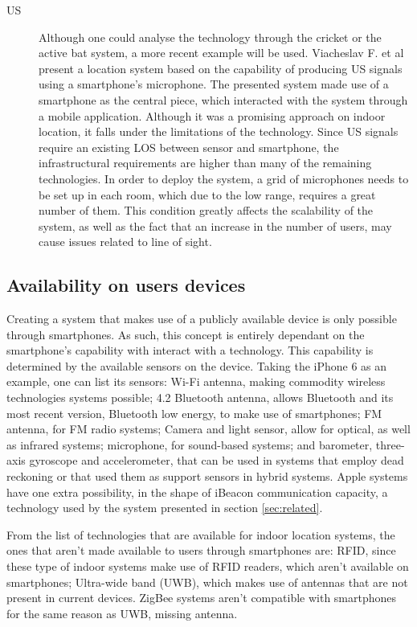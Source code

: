 \begin{description}
 
 
 
\item[\ac{US}] Although one could analyse the technology through the cricket or the active bat system, a more recent example will be used. 
Viacheslav F. et al \cite{us_ex} present a location system based on the capability of producing \ac{US} signals using a smartphone's microphone. The presented system made use of a smartphone as the central piece, which interacted with the system through a mobile application. Although it was a promising approach on indoor location, it falls under the limitations of the technology. Since \ac{US} signals require an existing \ac{LOS} between sensor and smartphone, the infrastructural requirements are higher than many of the remaining technologies. In order to deploy the system, a grid of microphones needs to be set up in each room, which due to the low range, requires a great number of them. This condition greatly affects the scalability of the system, as well as the fact that an increase in the number of users, may cause issues related to line of sight. 
\end{description} 
 
 
 
 
\subsection{Availability on users devices} 
\label{subsec:availability} 
 
 
Creating a system that makes use of a publicly available device is only possible through smartphones. As such, this concept is entirely dependant on the smartphone's capability with interact with a technology. This capability is determined by the available sensors on the device. 
Taking the iPhone 6 as an example, one can list its sensors\cite{iphone}: Wi-Fi antenna, making commodity wireless technologies systems possible; 4.2 Bluetooth antenna, allows Bluetooth and its most recent version, Bluetooth low energy, to make use of smartphones; FM antenna, for FM radio systems; Camera and light sensor, allow for optical, as well as infrared systems; microphone, for sound-based systems; and barometer, three-axis gyroscope and accelerometer, that can be used in systems that employ dead reckoning or that used them as support sensors in hybrid systems. Apple systems have one extra possibility, in the shape of iBeacon communication capacity, a technology used by the system presented in section \ref{sec:related}. 
 
 
From the list of technologies that are available for indoor location systems, the ones that aren't made available to users through smartphones are: RFID, since these type of indoor systems make use of \ac{RFID} readers, which aren't available on smartphones; Ultra-wide band (UWB), which makes use of antennas that are not present in current devices. ZigBee systems aren't compatible with smartphones for the same reason as UWB, missing antenna. 
 
